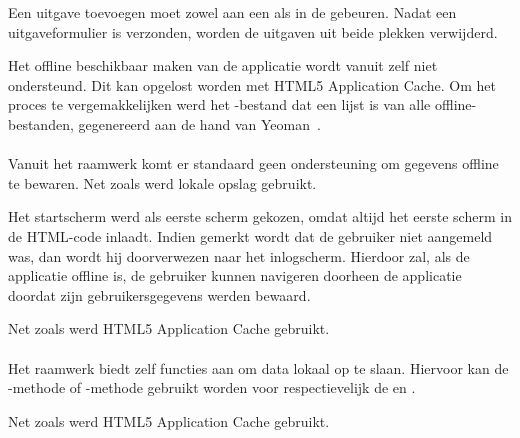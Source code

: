 Een uitgave toevoegen moet zowel aan een  als in de  gebeuren.
Nadat een uitgaveformulier is verzonden, worden de uitgaven uit beide plekken verwijderd.

Het offline beschikbaar maken van de applicatie wordt vanuit \kendo{} zelf niet ondersteund.
Dit kan opgelost worden met HTML5 Application Cache.
Om het proces te vergemakkelijken werd het -bestand dat een lijst is van alle offline-bestanden, gegenereerd aan de hand van Yeoman~\cite{Yeoman2013}.

\paragraph{\jqm}
Vanuit het raamwerk komt er standaard geen ondersteuning om gegevens offline te bewaren.
Net zoals \kendo{} werd lokale opslag gebruikt.

Het startscherm werd als eerste scherm gekozen, omdat \jqm{} altijd het eerste scherm in de HTML-code inlaadt.
Indien gemerkt wordt dat de gebruiker niet aangemeld was, dan wordt hij doorverwezen naar het inlogscherm.
Hierdoor zal, als de applicatie offline is, de gebruiker kunnen navigeren doorheen de applicatie doordat zijn gebruikersgegevens werden bewaard.

Net zoals \kendo{} werd HTML5 Application Cache gebruikt.

\paragraph{\lungo}
Het raamwerk biedt zelf functies aan om data lokaal op te slaan.
Hiervoor kan de -methode of -methode gebruikt worden voor respectievelijk de  en .

Net zoals \kendo{} werd HTML5 Application Cache gebruikt.